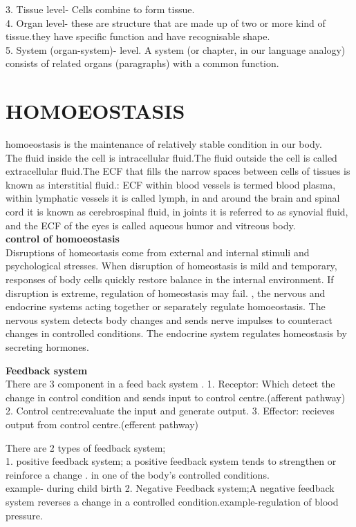 \documentclass[4pt]{article}
\begin{document}
3. Tissue level- Cells combine to form tissue.\\

4. Organ level- these are structure that are made up of two or more kind of tissue.they have specific function and have recognisable shape.\\
5.  System (organ-system)- level. A system (or chapter, in our 
language analogy) consists of related organs (paragraphs) with a 
common function.


\section{\huge\textbf{HOMOEOSTASIS}}
homoeostasis is the maintenance of relatively stable condition in our body.\\
The fluid inside the cell is intracellular fluid.The fluid outside the cell is called extracellular fluid.The ECF that fills the narrow 
spaces between cells of tissues is known as interstitial fluid.: ECF 
within blood vessels is termed blood plasma, within lymphatic vessels 
it is called lymph, in and around the brain and spinal cord it is known as 
cerebrospinal fluid, in joints it is referred to as synovial fluid, and the 
ECF of the eyes is called aqueous humor and vitreous body.\\
\textbf{control of homoeostasis}\\
Disruptions of homeostasis come from external and internal stimuli and 
 psychological stresses. When disruption of homeostasis is mild and temporary, 
responses of body cells quickly restore balance in the internal environment. If 
disruption is extreme, regulation of homeostasis may fail.
, the nervous and endocrine systems acting together or separately regulate homoeostasis. The nervous system detects body changes and 
sends nerve impulses to counteract changes in controlled conditions. The 
 endocrine system regulates homeostasis by secreting hormones.
 
 \textbf{Feedback system}\\
 There are 3 component in a feed back system .
 1. Receptor: Which detect the change in control condition and sends input to control centre.(afferent pathway)
 2. Control centre:evaluate the input and generate output.
 3. Effector: recieves output from control centre.(efferent pathway)
 
 There are 2 types of feedback system;\\
 1. positive feedback system; a 
positive feedback system tends to strengthen or reinforce a change .
in one of the body's controlled conditions.\\
example- during child birth
2. Negative Feedback system;A negative feedback system reverses
a change in a controlled condition.example-regulation of blood pressure.
\end{document}
